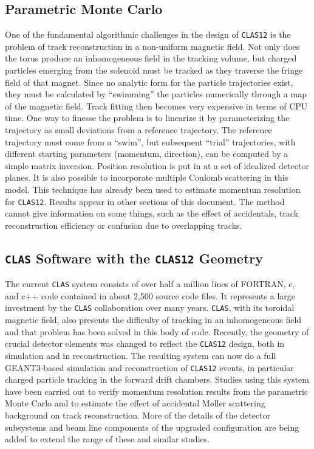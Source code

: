 \subsection{Parametric Monte Carlo}

One of the fundamental algorithmic challenges in the design of {\tt CLAS12} 
is the problem of track reconstruction in a non-uniform magnetic field.  Not 
only does the torus produce an inhomogeneous field in the tracking volume, 
but charged particles emerging from the solenoid must be tracked as they 
traverse the fringe field of that magnet. Since no analytic form for the 
particle trajectories exist, they must be calculated by ``swimming'' the
particles numerically through a map of the magnetic field. Track fitting 
then becomes very expensive in terms of CPU time. One way to finesse the 
problem is to linearize it by parameterizing the trajectory as small 
deviations from a reference trajectory. The reference trajectory must come 
from a ``swim'', but subsequent ``trial'' trajectories, with different 
starting parameters (momentum, direction), can be computed by a simple matrix 
inversion. Position resolution is put in at a set of idealized detector 
planes. It is also possible to incorporate multiple Coulomb scattering in 
this model. This technique has already been used to estimate momentum 
resolution for {\tt CLAS12}. Results appear in other sections of this 
document.  The method cannot give information on some things, such as the 
effect of accidentals, track reconstruction efficiency or confusion due to 
overlapping tracks.

\subsection{{\tt CLAS} Software with the {\tt CLAS12} Geometry}

The current {\tt CLAS} system consists of over half a million lines of 
FORTRAN, c, and c++ code contained in about 2,500 source code files. It 
represents a large investment by the {\tt CLAS} collaboration over many 
years. {\tt CLAS}, with its toroidal magnetic field, also presents the 
difficulty of tracking in an inhomogeneous field and that problem has 
been solved in this body of code.  Recently, the geometry of crucial detector 
elements was changed to reflect the {\tt CLAS12} design, both in simulation 
and in reconstruction. The resulting system can now do a full GEANT3-based 
simulation and reconstruction of {\tt CLAS12} events, in particular charged 
particle tracking in the forward drift chambers. Studies using this system 
have been carried out to verify momentum resolution results from the 
parametric Monte Carlo and to estimate the effect of accidental M{\o}ller 
scattering background on track reconstruction. More of the details of the 
detector subsystems and beam line components of the upgraded configuration 
are being added to extend the range of these and similar studies.

